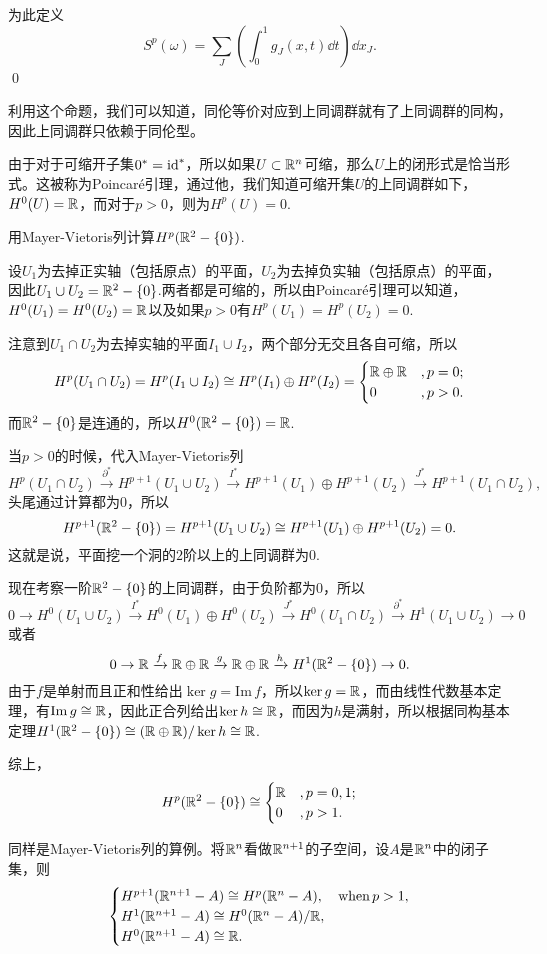 为此定义
\[
S^p(\omega)=\sum_J\left(\int_0^1g_J(x,t)\dd t\right)\dd x_J.
\]\qed

利用这个命题，我们可以知道，同伦等价对应到上同调群就有了上同调群的同构，因此上同调群只依赖于同伦型。

\para 由于对于可缩开子集$0^*=\operatorname{id}^*$，所以如果$U\subset \mathbb{R}^n$可缩，那么$U$上的闭形式是恰当形式。这被称为Poincar\'{e}引理，通过他，我们知道可缩开集$U$的上同调群如下，$H^0(U)=\mathbb{R}$，而对于$p>0$，则为$H^p(U)=0$.

\para 用Mayer-Vietoris列计算$H^{p}(\mathbb{R}^2-\{0\})$.

设$U_1$为去掉正实轴（包括原点）的平面，$U_2$为去掉负实轴（包括原点）的平面，因此$U_1\cup U_2=\mathbb{R}^2-\{0\}$.两者都是可缩的，所以由Poincaré引理可以知道，$H^0(U_1)=H^0(U_2)=\mathbb{R}$以及如果$p>0$有$H^p(U_1)=H^p(U_2)=0$.

注意到$U_1\cap U_2$为去掉实轴的平面$I_1\cup I_2$，两个部分无交且各自可缩，所以
\[
H^p(U_1\cap U_2)=H^p(I_1\cup I_2) \cong H^p(I_1)\oplus H^p(I_2) =\begin{cases}
\mathbb{R}\oplus\mathbb{R}&,p=0;\\
0&,p>0.
\end{cases}
\]
而$\mathbb{R}^2-\{0\}$是连通的，所以$H^0(\mathbb{R}^2-\{0\})=\mathbb{R}$.

当$p>0$的时候，代入Mayer-Vietoris列
\[
H^p(U_1\cap U_2)\xrightarrow{\partial^*}H^{p+1}(U_1\cup U_2)\xrightarrow{I^*}H^{p+1}(U_1)\oplus H^{p+1}(U_2)\xrightarrow{J^*}H^{p+1}(U_1\cap U_2),
\]
头尾通过计算都为$0$，所以
\[
H^{p+1}(\mathbb{R}^2-\{0\})=H^{p+1}(U_1\cup U_2)\cong H^{p+1}(U_1)\oplus H^{p+1}(U_2)=0.
\]
这就是说，平面挖一个洞的$2$阶以上的上同调群为$0$.

现在考察一阶$\mathbb{R}^2-\{0\}$的上同调群，由于负阶都为$0$，所以
 \[
0\to H^0(U_1\cup U_2)\xrightarrow{I^*}H^0(U_1)\oplus H^0(U_2)\xrightarrow{J^*}H^0(U_1\cap U_2)\xrightarrow{\partial^*}H^{1}(U_1\cup U_2)\to 0
\]
或者
 \[
0\to \mathbb{R}\xrightarrow{f}\mathbb{R}\oplus\mathbb{R}\xrightarrow{g}\mathbb{R}\oplus\mathbb{R}\xrightarrow{h}H^{1}(\mathbb{R}^2-\{0\})\to 0.
\]
由于$f$是单射而且正和性给出$\ker g = \mathrm{Im}\,f$，所以$\ker g =\mathbb{R}$，而由线性代数基本定理，有$\mathrm{Im}\,g \cong \mathbb{R}$，因此正合列给出$\ker h \cong \mathbb{R}$，而因为$h$是满射，所以根据同构基本定理$H^{1}(\mathbb{R}^2-\{0\})\cong(\mathbb{R}\oplus\mathbb{R})/\ker h \cong \mathbb{R}$.

综上，\[H^{p}(\mathbb{R}^2-\{0\})\cong
\begin{cases}
\mathbb{R}&,p=0,1;\\
0&,p>1.
\end{cases}\]

\para  同样是Mayer-Vietoris列的算例。将$\mathbb{R}^n$看做$\mathbb{R}^{n+1}$的子空间，设$A$是$\mathbb{R}^n$中的闭子集，则
\[
\begin{cases}
H^{p+1}(\mathbb{R}^{n+1}-A)\cong H^p(\mathbb{R}^n-A),&\text{when}\,p>1,\\
H^{1}(\mathbb{R}^{n+1}-A)\cong H^0(\mathbb{R}^n-A)/\mathbb{R},&\\
H^{0}(\mathbb{R}^{n+1}-A)\cong \mathbb{R}.&
\end{cases}
\]

